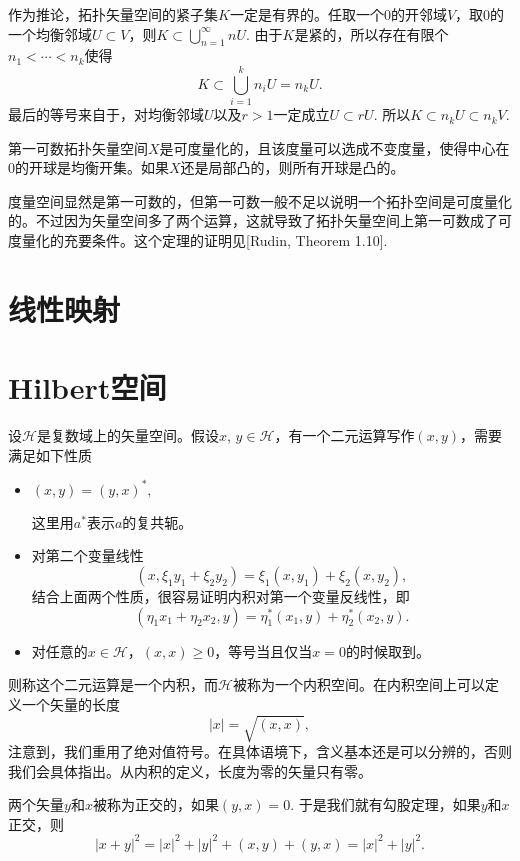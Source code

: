 作为推论，拓扑矢量空间的紧子集$K$一定是有界的。任取一个$0$的开邻域$V$，取$0$的一个均衡邻域$U\subset V$，则$K\subset \bigcup_{n=1}^\infty nU$. 由于$K$是紧的，所以存在有限个$n_1< \cdots <n_k$使得
\[
	K\subset \bigcup_{i=1}^k n_iU=n_k U.
\]
最后的等号来自于，对均衡邻域$U$以及$r>1$一定成立$U\subset rU$. 所以$K\subset n_k U\subset n_k V$.

\begin{thm}
第一可数拓扑矢量空间$X$是可度量化的，且该度量可以选成不变度量，使得中心在$0$的开球是均衡开集。如果$X$还是局部凸的，则所有开球是凸的。
\end{thm}

度量空间显然是第一可数的，但第一可数一般不足以说明一个拓扑空间是可度量化的。不过因为矢量空间多了两个运算，这就导致了拓扑矢量空间上第一可数成了可度量化的充要条件。这个定理的证明见[Rudin, Theorem 1.10].

\section{线性映射}

\section{Hilbert空间}

设$\mathcal{H}$是复数域上的矢量空间。假设$x$, $y\in \mathcal{H}$，有一个二元运算写作$(x,y)$，需要满足如下性质
\begin{itemize}
\item $(x,y)=(y,x)^*,$

这里用$a^*$表示$a$的复共轭。

\item 对第二个变量线性
\[
(x,\xi_1y_1+\xi_2y_2)=\xi_1(x,y_1)+\xi_2(x,y_2),
\]
结合上面两个性质，很容易证明内积对第一个变量反线性，即
\[
(\eta_1x_1+\eta_2x_2,y)=\eta_1^*(x_1,y)+\eta_2^*(x_2,y).
\]
\item 对任意的$x\in \mathcal{H}$，$(x,x)\geq 0$，等号当且仅当$x=0$的时候取到。
\end{itemize}

则称这个二元运算是一个内积，而$\mathcal{H}$被称为一个内积空间。在内积空间上可以定义一个矢量的长度
\[
	|x|=\sqrt{(x,x)},
\]
注意到，我们重用了绝对值符号。在具体语境下，含义基本还是可以分辨的，否则我们会具体指出。从内积的定义，长度为零的矢量只有零。

\begin{para}
两个矢量$y$和$x$被称为正交的，如果$(y,x)=0$. 于是我们就有勾股定理，如果$y$和$x$正交，则
\[
	|x+y|^2=|x|^2+|y|^2+(x,y)+(y,x)=|x|^2+|y|^2.
\]
\end{para}

